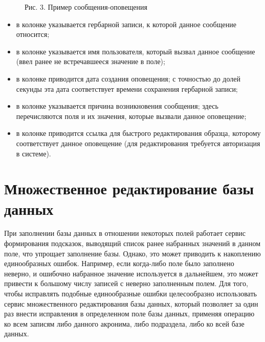 \documentclass[letterpaper,10pt,russian]{sphinxmanual}
\begin{document}
\begin{figure}[htbp]
\centering
\capstart

\noindent{}
\caption{Рис. 3. Пример сообщения-оповещения}\label{\detokenize{main:main-pic3}}\label{\detokenize{main:id66}}\end{figure}
\begin{itemize}
\item {} 
в колонке  указывается  гербарной записи,
к которой данное сообщение относится;

\item {} 
в колонке  указывается имя пользователя,
который вызвал данное сообщение (ввел ранее не встречавшееся значение в поле);

\item {} 
в колонке  приводится дата создания оповещения;
с точностью до долей секунды эта дата соответствует времени сохранения гербарной записи;

\item {} 
в колонке  указывается причина возникновения сообщения;
здесь перечисляются поля и их значения, которые вызвали данное оповещение;

\item {} 
в колонке  приводится ссылка для быстрого редактирования образца,
которому соответствует данное оповещение (для редактирования требуется авторизация в системе).

\end{itemize}


\section{Множественное редактирование базы данных}
\label{\detokenize{main:id58}}
При заполнении базы данных в отношении некоторых полей работает сервис формирования
подсказок, выводящий список ранее набранных значений в данном поле, что упрощает
заполнение базы. Однако, это может приводить к накоплению единообразных ошибок. Например,
если когда-либо поле было заполнено неверно, и ошибочно набранное значение
используется в дальнейшем, это может привести к большому числу записей с неверно
заполненным полем. Для того, чтобы исправлять подобные единообразные ошибки
целесообразно использовать сервис множественного редактирования базы данных,
который позволяет за один раз внести исправления в определенном
поле базы данных, применяя операцию ко всем записям либо данного акронима,
либо подраздела, либо ко всей базе данных.
\end{document}

